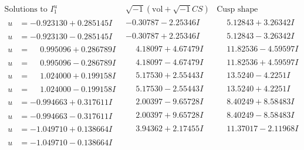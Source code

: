\documentclass[1p]{elsarticle_modified}
\theoremstyle{definition}
\newcommand{\I}{\sqrt{-1}}
\begin{document}
$$\begin{array}{c|c|c}  
\text{Solutions to }I^u_{1}& \I (\text{vol} + \sqrt{-1}CS) & \text{Cusp shape}\\
 \hline 
\begin{aligned}
u &= -0.923130 + 0.285145 I\end{aligned}
 & -0.30787 - 2.25346 I & \phantom{-}5.12843 + 3.26342 I \\ \hline\begin{aligned}
u &= -0.923130 - 0.285145 I\end{aligned}
 & -0.30787 + 2.25346 I & \phantom{-}5.12843 - 3.26342 I \\ \hline\begin{aligned}
u &= \phantom{-}0.995096 + 0.286789 I\end{aligned}
 & \phantom{-}4.18097 + 4.67479 I & \phantom{-}11.82536 - 4.59597 I \\ \hline\begin{aligned}
u &= \phantom{-}0.995096 - 0.286789 I\end{aligned}
 & \phantom{-}4.18097 - 4.67479 I & \phantom{-}11.82536 + 4.59597 I \\ \hline\begin{aligned}
u &= \phantom{-}1.024000 + 0.199158 I\end{aligned}
 & \phantom{-}5.17530 + 2.55443 I & \phantom{-}13.5240 - 4.2251 I \\ \hline\begin{aligned}
u &= \phantom{-}1.024000 - 0.199158 I\end{aligned}
 & \phantom{-}5.17530 - 2.55443 I & \phantom{-}13.5240 + 4.2251 I \\ \hline\begin{aligned}
u &= -0.994663 + 0.317611 I\end{aligned}
 & \phantom{-}2.00397 - 9.65728 I & \phantom{-}8.40249 + 8.58483 I \\ \hline\begin{aligned}
u &= -0.994663 - 0.317611 I\end{aligned}
 & \phantom{-}2.00397 + 9.65728 I & \phantom{-}8.40249 - 8.58483 I \\ \hline\begin{aligned}
u &= -1.049710 + 0.138664 I\end{aligned}
 & \phantom{-}3.94362 + 2.17455 I & \phantom{-}11.37017 - 2.11968 I \\ \hline\begin{aligned}
u &= -1.049710 - 0.138664 I\end{aligned}

\end{array}$$
\end{document}

